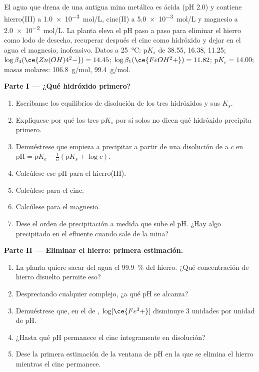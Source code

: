 \begin{problem}
\label{pb:b1:precipitation:1}
El agua que drena de una antigua mina metálica es ácida (pH 2.0) y
contiene hierro(III) a \qty{1.0e-3}{mol/L}, cinc(II) a
\qty{5.0e-3}{mol/L} y magnesio a \qty{2.0e-2}{mol/L}. La planta eleva el
pH paso a paso para eliminar el hierro como lodo de desecho, recuperar
después el cinc como hidróxido y dejar en el agua el magnesio, inofensivo.
Datos a \qty{25}{\celsius}: $\mathrm{p}K_s$ de  38.55,
16.38,  11.25; $\log\beta_4(\ce{Zn(OH)4^2-}) = 14.45$;
$\log\beta_1(\ce{FeOH^2+}) = 11.82$; $\mathrm{p}K_e = 14.00$; masas
molares:  \qty{106.8}{g/mol},  \qty{99.4}{g/mol}.

\medskip
\noindent\textbf{Parte I --- ¿Qué hidróxido primero?}
\begin{enumerate}
  \item Escríbanse los equilibrios de disolución de los tres hidróxidos y
        sus $K_s$.
  \item Explíquese por qué los tres $\mathrm{p}K_s$ por sí solos no dicen
        qué hidróxido precipita primero.
  \item Demuéstrese que  empieza a precipitar a partir de una
        disolución de  a $c$ en $\mathrm{pH} = \mathrm{p}K_e -
        \frac1n(\mathrm{p}K_s + \log c)$.
  \item Calcúlese ese pH para el hierro(III).
  \item Calcúlese para el cinc.
  \item Calcúlese para el magnesio.
  \item Dese el orden de precipitación a medida que sube el pH. ¿Hay algo
        precipitado en el efluente cuando sale de la mina?
\end{enumerate}

\medskip
\noindent\textbf{Parte II --- Eliminar el hierro: primera estimación.}
\begin{enumerate}[resume]
  \item La planta quiere sacar del agua el \qty{99.9}{\percent} del
        hierro. ¿Qué concentración de hierro disuelto permite eso?
  \item Despreciando cualquier complejo, ¿a qué pH se alcanza?
  \item Demuéstrese que, en el  de ,
        $\log[\ce{Fe^3+}]$ disminuye 3 unidades por unidad de pH.
  \item ¿Hasta qué pH permanece el cinc íntegramente en disolución?
  \item Dese la primera estimación de la ventana de pH en la que se
        elimina el hierro mientras el cinc permanece.
\end{enumerate}


\end{problem}
